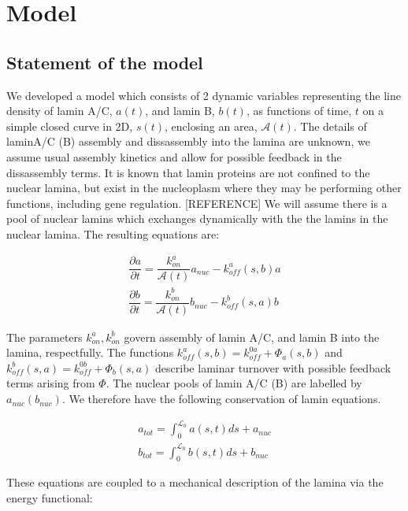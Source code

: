 \section{Model}

\subsection{Statement of the model} We developed a model which consists of 2 dynamic variables representing the line density of lamin A/C, $a(t)$, and lamin B, $b(t)$, as functions of time, $t$ on a simple closed curve in 2D, $s(t)$, enclosing an area, $\mathcal{A}(t)$. The details of laminA/C (B)  assembly and dissassembly into the lamina are unknown, we assume usual assembly kinetics and allow for possible feedback in the dissassembly terms. It is known that lamin proteins are not confined to the nuclear lamina, but exist in the nucleoplasm where they may be performing other functions, including gene regulation. [REFERENCE] We will assume there is a pool of nuclear lamins which exchanges dynamically with the the lamins in the nuclear lamina. The resulting equations are:

\begin{align}
\dfrac{\partial a}{\partial t} = \dfrac{k_{on}^a}{\mathcal{A}(t)} a_{nuc} - k_{off}^a (s,b)a\\[7pt]
\dfrac{\partial b}{\partial t} = \dfrac{k_{on}^b}{\mathcal{A}(t)}b_{nuc} - k_{off}^b  (s,a)b \label{eq::laminaKinetics}
\end{align}

The parameters $k_{on}^a , k_{on}^b$  govern assembly of lamin A/C, and lamin B into the lamina, respectfully. The functions $k_{off}^a (s,b) = k_{off}^{0a} + \Phi_a(s,b)$ and $ k_{off}^b(s,a)  = k_{off}^{0b} + \Phi_b(s,a)$ describe laminar turnover with possible feedback terms arising from $\Phi$. The nuclear pools of lamin A/C (B) are labelled by $a_{nuc} (b_{nuc})$. We therefore have the following conservation of lamin equations. 

\begin{align}
a_{tot}= \int_0^{\mathcal{L}_0} a(s,t) ds + a_{nuc}\\
b_{tot} = \int_0^{\mathcal{L}_0} b(s,t) ds + b_{nuc}
\end{align}

These equations are coupled to a mechanical description of the lamina via the energy functional:

